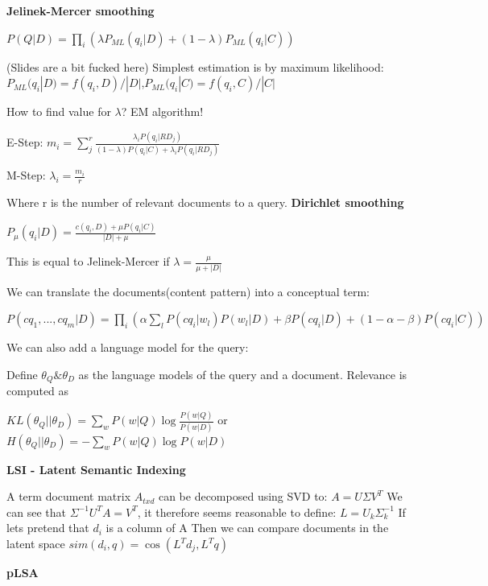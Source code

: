 \documentclass[a4paper,10pt,landscape]{article}
\begin{document}
\begin{multicols}{3}
\begin{center}
\textbf{Jelinek-Mercer smoothing}

$P(Q|D) = \prod_i(\lambda P_{ML}(q_i|D)+(1-\lambda)P_{ML}(q_i|C))$

(Slides are a bit fucked here)
Simplest estimation is by maximum likelihood:
$P_{ML}(q_i|D) = f(q_i,D)/|D|$,$P_{ML}(q_i|C) = f(q_i,C)/|C|$

How to find value for $\lambda$? EM algorithm!

E-Step:
$m_i = \sum_j^r\frac{\lambda_iP(q_i|RD_j)}{(1-\lambda)P(q_i|C)+\lambda_iP(q_i|RD_j)}$

M-Step:
$\lambda_i =\frac{m_i}{r}$

Where r is the number of relevant documents to a query.
\textbf{Dirichlet smoothing}

$P_{\mu}(q_i|D) = \frac{c(q_i,D)+\mu P(q_i|C)}{|D|+\mu}$

This is equal to Jelinek-Mercer if $\lambda = \frac{\mu}{\mu+|D|}$

We can translate the documents(content pattern) into a conceptual term:

$P(cq_1,...,cq_m|D) = \prod_i(\alpha\sum_lP(cq_i|w_l)P(w_l|D)+\beta P(cq_i|D)+(1-\alpha-\beta)P(cq_i|C))$

We can also add a language model for the query:

Define $\theta_Q \& \theta_D$ as the language models of the query and a document.
Relevance is computed as 

$KL(\theta_Q||\theta_D) = \sum_w P(w|Q)\log\frac{P(w|Q)}{P(w|D)}$ or
$H(\theta_Q||\theta_D) = -\sum_w P(w|Q)\log P(w|D)$ 

{\Large \textbf{LSI - Latent Semantic Indexing} \par}
\end{center}

A term document matrix $A_{txd}$ can be decomposed using SVD to:
$A = U\Sigma V^T$
We can see that $\Sigma^{-1}U^TA = V^T$, it therefore seems reasonable to define: $L = U_k\Sigma_k^{-1}$
If lets pretend that $d_i$ is a column of A
Then we can compare documents in the latent space
$sim(d_i,q) = \cos(L^Td_j,L^Tq)$ \\



\begin{center}
{\Large \textbf{pLSA} \par}
\end{center}


\end{multicols}
\end{document}
